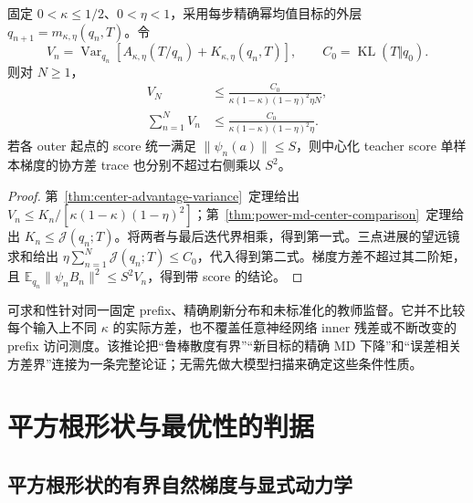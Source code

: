 \documentclass[lang=cn,scheme=chinese,openany]{../book/elegantbook}
\newcommand{\E}{\mathbb E}
\newcommand{\KL}{\operatorname{KL}}
\newcommand{\Var}{\operatorname{Var}}
\begin{document}
\begin{corollary}[精确外层的教师监督噪声可求和]
\label{cor:power-md-summable-variance}
固定 $0<\kappa\le1/2$、$0<\eta<1$，采用每步精确幂均值目标的外层 $q_{n+1}=m_{\kappa,\eta}(q_n,T)$。令
\begin{equation}
 V_n=\Var_{q_n}\!\left[A_{\kappa,\eta}(T/q_n)+K_{\kappa,\eta}(q_n,T)\right],
 \qquad C_0=\KL(T\Vert q_0).
\end{equation}
则对 $N\ge1$，
\begin{align}
 V_N&\le\frac{C_0}{\kappa(1-\kappa)(1-\eta)^2\eta N},\\
 \sum_{n=1}^N V_n&\le\frac{C_0}{\kappa(1-\kappa)(1-\eta)^2\eta}.
 \label{eq:power-md-summable-variance}
\end{align}
若各 outer 起点的 score 统一满足 $\|\psi_n(a)\|\le S$，则中心化 teacher score 单样本梯度的协方差 trace 也分别不超过右侧乘以 $S^2$。
\end{corollary}

\begin{proof}
第~\ref{thm:center-advantage-variance}~定理给出 $V_n\le K_n/[\kappa(1-\kappa)(1-\eta)^2]$；第~\ref{thm:power-md-center-comparison}~定理给出 $K_n\le\mathcal J(q_n;T)$。将两者与最后迭代界相乘，得到第一式。三点进展的望远镜求和给出 $\eta\sum_{n=1}^N\mathcal J(q_n;T)\le C_0$，代入得到第二式。梯度方差不超过其二阶矩，且 $\E_{q_n}\|\psi_n B_n\|^2\le S^2V_n$，得到带 score 的结论。
\end{proof}

可求和性针对同一固定 prefix、精确刷新分布和未标准化的教师监督。它并不比较每个输入上不同 $\kappa$ 的实际方差，也不覆盖任意神经网络 inner 残差或不断改变的 prefix 访问测度。该推论把“鲁棒散度有界”“新目标的精确 MD 下降”和“误差相关方差界”连接为一条完整论证；无需先做大模型扫描来确定这些条件性质。



\section{平方根形状与最优性的判据}
\label{sec:power-half-and-optimality}

\subsection{平方根形状的有界自然梯度与显式动力学}
\end{document}
